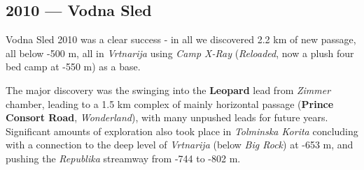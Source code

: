 \begin{tcolorbox}
\chapter{2010 --- Vodna Sled}

Vodna Sled 2010 was a clear success - in all we discovered 2.2 km of new
passage, all below -500 m, all in \emph{Vrtnarija} using \emph{Camp
X-Ray} (\emph{Reloaded}, now a plush four bed camp at -550 m) as a base.

The major discovery was the swinging into the \textbf{Leopard} lead from
\emph{Zimmer} chamber, leading to a 1.5 km complex of mainly horizontal
passage (\textbf{Prince Consort Road}, \emph{Wonderland}), with many
unpushed leads for future years. Significant amounts of exploration also
took place in \emph{Tolminska Korita} concluding with a connection to
the deep level of \emph{Vrtnarija} (below \emph{Big Rock}) at -653 m,
and pushing the \emph{Republika} streamway from -744 to -802 m.


\end{tcolorbox}
\BgThispage









